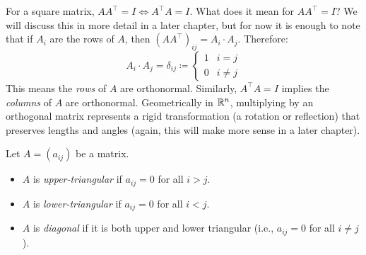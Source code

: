 \documentclass[../linear_algebra_and_groups.tex]{subfiles}
\begin{document}
\begin{remark}
    For a square matrix, $AA^\top=I \iff A^\top A=I$. What does it mean for $AA^\top = I$? We will discuss this in more detail in a later chapter, but for now it is enough to note that if $A_i$ are the rows of $A$, then $\left(AA^\top\right)_{ij} = A_i \cdot A_j$. Therefore:
    $$A_i \cdot A_j = \delta_{ij} \coloneqq \begin{cases} 1 & i=j \\ 0 & i\ne j \end{cases}$$
    This means the \textit{rows} of $A$ are orthonormal. Similarly, $A^\top A=I$ implies the \textit{columns} of $A$ are orthonormal. Geometrically in $\mathbb{R}^n$, multiplying by an orthogonal matrix represents a rigid transformation (a rotation or reflection) that preserves lengths and angles (again, this will make more sense in a later chapter).
\end{remark}

\begin{definition}
    \begin{shaded*}
        Let $A = (a_{ij})$ be a matrix.
        \begin{itemize}
            \item $A$ is \textit{upper-triangular} if $a_{ij}=0$ for all $i>j$.
            \item $A$ is \textit{lower-triangular} if $a_{ij}=0$ for all $i<j$.
            \item $A$ is \textit{diagonal} if it is both upper and lower triangular (i.e., $a_{ij}=0$ for all $i\ne j$).
        \end{itemize}
    \end{shaded*}
\end{definition}
\end{document}
